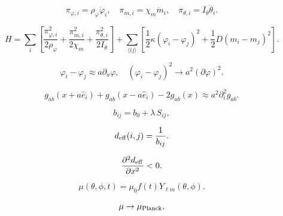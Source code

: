\[
\pi_{\varphi,i} = \rho_\varphi \dot{\varphi}_i,\quad
\pi_{m,i} = \chi_m\dot{m}_i,\quad
\pi_{\theta,i}=I_\theta \dot{\theta}_i.
\]

\[
H = \sum_i\left[
\frac{\pi_{\varphi,i}^2}{2\rho_\varphi}
+ \frac{\pi_{m,i}^2}{2\chi_m}
+ \frac{\pi_{\theta,i}^2}{2I_\theta}
\right]
+ \!\sum_{\langle ij\rangle}\!
\left[\frac12\kappa(\varphi_i-\varphi_j)^2
+ \frac12D(m_i-m_j)^2\right].
\]

\[
\varphi_i - \varphi_j \approx a\partial_a\varphi,
\quad
(\varphi_i - \varphi_j)^2 \to a^2(\partial\varphi)^2.
\]

\[
g_{ab}(x+a\hat{e}_i) + g_{ab}(x-a\hat{e}_i) -2g_{ab}(x)
\approx a^2\partial_i^2 g_{ab}.
\]

\[
b_{ij} = b_0 + \lambda\,S_{ij},
\]

\[
d_{\rm eff}(i,j) = \frac{1}{b_{ij}}.
\]

\[
\frac{\partial^2 d_{\rm eff}}{\partial x^2} < 0.
\]

\[
\mu(\theta,\phi,t) = \mu_0 f(t)Y_{\ell m}(\theta,\phi).
\]

\[
\mu \to \mu_{\rm Planck},
\]

